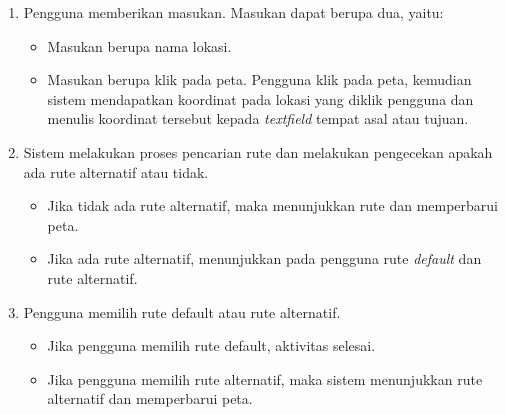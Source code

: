 \begin{enumerate}
	\item Pengguna memberikan masukan. Masukan dapat berupa dua, yaitu:
	\begin{itemize}
		\item Masukan berupa nama lokasi.
		\item Masukan berupa klik pada peta. Pengguna klik pada peta, kemudian sistem mendapatkan koordinat pada lokasi yang diklik pengguna dan menulis koordinat tersebut kepada \textit{textfield} tempat asal atau tujuan.
	\end{itemize}
	\item Sistem melakukan proses pencarian rute dan melakukan pengecekan apakah ada rute alternatif atau tidak.
	\begin{itemize}
		\item Jika tidak ada rute alternatif, maka menunjukkan rute dan memperbarui peta.
		\item Jika ada rute alternatif, menunjukkan pada pengguna rute \textit{default} dan rute alternatif.
	\end{itemize}
	\item Pengguna memilih rute default atau rute alternatif.
	\begin{itemize}
		\item Jika pengguna memilih rute default, aktivitas selesai.
		\item Jika pengguna memilih rute alternatif, maka sistem menunjukkan rute alternatif dan memperbarui peta.
	\end{itemize}
\end{enumerate}
